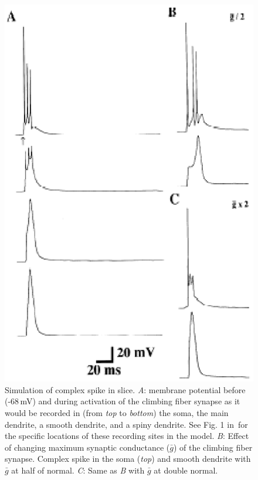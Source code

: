 \documentclass[12pt]{article}
\begin{document}
\begin{figure}[h]
\centering
   \includegraphics[scale=0.75]{figures/Fig.2.1.eps}
   \caption{Simulation of complex spike in slice. {\it A}: membrane potential before (-68\,mV) and during activation of the climbing fiber synapse as it would be recorded in (from {\em top} to {\em bottom}) the soma, the main dendrite, a smooth dendrite, and a spiny dendrite. See Fig. 1 in\,\cite{deschutter94:_purkin_i} for the specific locations of these recording sites in the model. {\it B}: Effect of changing maximum synaptic conductance ($\bar g$) of the climbing fiber synapse. Complex spike in the soma ({\em top}) and smooth dendrite with $\bar g$ at half of normal. {\it C}: Same as {\it B} with $\bar g$ at double normal.}
   \label{fig:DS2.1}
\end{figure}
\end{document}
